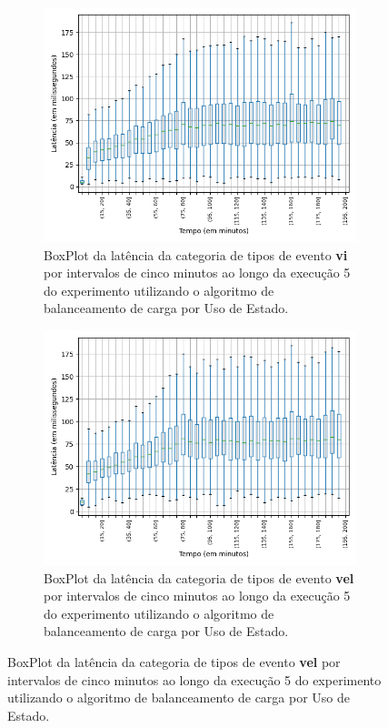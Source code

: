 \begin{figure}
\begin{subfigure}{.5\textwidth}
\centering
\includegraphics[width=\textwidth]{figuras/graphics/boxplot_10-dez-su_vi.png}
\caption{BoxPlot da latência da categoria de tipos de evento \textbf{vi} por intervalos de cinco minutos ao longo da execução 5 do experimento utilizando o algoritmo de balanceamento de carga por Uso de Estado.}
\label{fig:BoxPlot_vi_SU_10-dez-su}
\end{subfigure}%
\centering
\begin{subfigure}{.5\textwidth}
\centering
\includegraphics[width=\textwidth]{figuras/graphics/boxplot_10-dez-su_vel.png}
\caption{BoxPlot da latência da categoria de tipos de evento \textbf{vel} por intervalos de cinco minutos ao longo da execução 5 do experimento utilizando o algoritmo de balanceamento de carga por Uso de Estado.}
\label{fig:BoxPlot_vel_SU_10-dez-su}
\end{subfigure}%


\end{figure}
